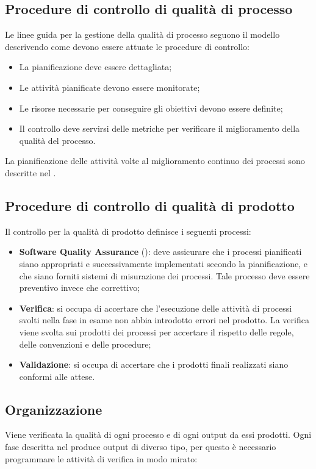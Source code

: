 	\subsection{Procedure di controllo di qualità di processo}
	Le linee guida per la gestione della qualità di processo seguono il modello  descrivendo come devono essere attuate le procedure di controllo:

		\begin{itemize}
			\item La pianificazione deve essere dettagliata;
			\item Le attività pianificate devono essere monitorate;
			\item Le risorse necessarie per conseguire gli obiettivi devono essere definite;
			\item Il controllo deve servirsi delle metriche per verificare il miglioramento della qualità del processo.
		\end{itemize}

	La pianificazione delle attività volte al miglioramento continuo dei processi sono descritte nel \PianoDiProgetto.

	\subsection{Procedure di controllo di qualità di prodotto}
	Il controllo per la qualità di prodotto definisce i seguenti processi:

		\begin{itemize}
			\item \textbf{Software Quality Assurance} (): deve assicurare che i processi pianificati siano appropriati e successivamente implementati secondo la pianificazione, e che siano forniti sistemi di misurazione dei processi. Tale processo deve essere preventivo invece che correttivo;
			\item \textbf{Verifica}: si occupa di accertare che l’esecuzione delle attività di processi svolti nella fase in esame non abbia introdotto errori nel prodotto. La verifica viene svolta sui prodotti dei processi per accertare il rispetto delle regole, delle convenzioni e delle procedure;
			\item \textbf{Validazione}: si occupa di accertare che i prodotti finali realizzati siano conformi alle attese.
		\end{itemize}

	
	\subsection{Organizzazione}
	Viene verificata la qualità di ogni processo e di ogni output da essi prodotti. Ogni fase  descritta nel \PianoDiProgetto{} produce output di diverso tipo, per questo è necessario programmare le attività di verifica in modo mirato:

